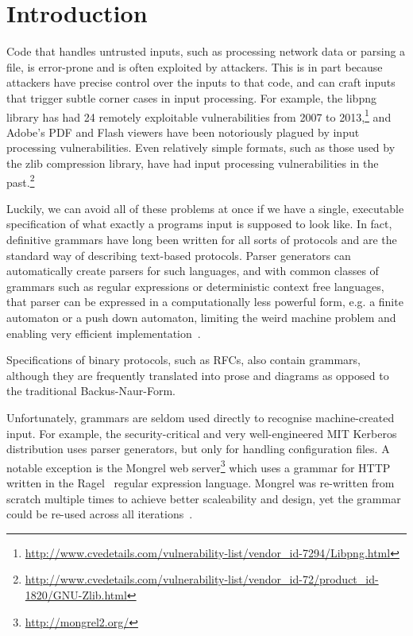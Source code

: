 \section{Introduction}

Code that handles untrusted inputs, such as processing network
data or parsing a file, is error-prone and is often exploited by
attackers.  This is in part because attackers have precise control
over the inputs to that code, and can craft inputs that trigger
subtle corner cases in input processing.  For example, the libpng
library has had 24 remotely exploitable vulnerabilities from 2007 to
2013,\footnote{\url{http://www.cvedetails.com/vulnerability-list/vendor_id-7294/Libpng.html}}
and Adobe's PDF and Flash viewers have been notoriously
plagued by input processing vulnerabilities.  Even relatively
simple formats, such as those used by the zlib compression
library, have had input processing vulnerabilities in the
past.\footnote{\url{http://www.cvedetails.com/vulnerability-list/vendor_id-72/product_id-1820/GNU-Zlib.html}}



Luckily, we can avoid all of these problems at once if we have a single,
executable specification of what exactly a programs input is supposed
to look like. In fact, definitive grammars have long been written for
all sorts of protocols and are the standard way of describing text-based
protocols.  Parser generators can automatically create parsers for such
languages, and with common classes of grammars such as regular expressions
or deterministic context free languages, that parser can be expressed
in a computationally less powerful form, e.g. a finite automaton or a
push down automaton, limiting the weird machine problem and enabling
very efficient implementation~\cite{Knuth1965607}.

Specifications of binary protocols, such as RFCs, also contain grammars,
although they are frequently translated into prose and diagrams as
opposed to the traditional Backus-Naur-Form.

Unfortunately, grammars are seldom used directly to recognise
machine-created input. For example, the security-critical and very
well-engineered MIT Kerberos distribution uses parser generators, but
only for handling configuration files. A notable exception is the Mongrel
web server\footnote{\url{http://mongrel2.org/}} which uses a grammar
for HTTP written in the Ragel~\cite{ragel-paper} regular expression
language. Mongrel was re-written from scratch multiple times to achieve
better scaleability and design, yet the grammar could be  re-used across
all iterations~\cite{patterson-citation}.

